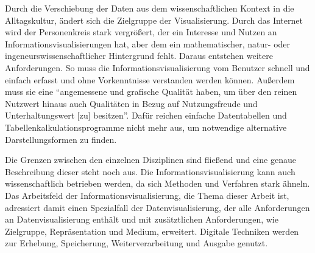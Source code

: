 \documentclass[a4paper, 12pt, DIVcalc, onepage, pdftex, headsepline, footsepline]{scrreprt}
\begin{document}
Durch die Verschiebung der Daten aus dem wissenschaftlichen Kontext
in die Alltagskultur, ändert sich die Zielgruppe der Visualisierung. Durch das Internet
wird der Personenkreis stark vergrößert, der ein Interesse und Nutzen an Informationsvisualisierungen
hat, aber dem ein mathematischer, natur- oder ingeneurswissenschaftlicher Hintergrund
fehlt. Daraus entstehen weitere Anforderungen. So muss die Informationsvisualisierung vom Benutzer
schnell und einfach erfasst und ohne Vorkenntnisse verstanden werden können.
Außerdem muss sie eine "`angemessene und grafische Qualität haben, um über den
reinen Nutzwert hinaus auch Qualitäten in Bezug auf Nutzungsfreude und Unterhaltungswert [zu] besitzen"'\citep[S.\,438]{Preim}.
Dafür reichen einfache Datentabellen und Tabellenkalkulationsprogramme
nicht mehr aus, um notwendige alternative Darstellungsformen zu finden.

Die Grenzen zwischen den einzelnen Disziplinen sind fließend 
und eine genaue Beschreibung dieser steht noch aus. Die Informationsvisualisierung kann
auch wissenschaftlich betrieben werden, da sich Methoden und Verfahren stark ähneln.
Das Arbeitsfeld der Informationsvisualisierung, die Thema dieser Arbeit ist, adressiert damit
einen Spezialfall der Datenvisualisierung, der alle Anforderungen an Datenvisualisierung enthält
und mit zusätztlichen Anforderungen, wie Zielgruppe, Repräsentation und Medium, erweitert. Digitale
Techniken werden zur Erhebung, Speicherung, Weiterverarbeitung und Ausgabe genutzt.
\end{document}
